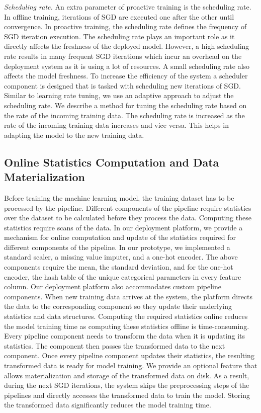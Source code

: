 \textit{Scheduling rate.}
An extra parameter of proactive training is the scheduling rate.
In offline training, iterations of SGD are executed one after the other until convergence.
In proactive training, the scheduling rate defines the frequency of SGD iteration execution.
The scheduling rate plays an important role as it directly affects the freshness of the deployed model.
However, a high scheduling rate results in many frequent SGD iterations which incur an overhead on the deployment system as it is using a lot of resources.
A small scheduling rate also affects the model freshness.
To increase the efficiency of the system a scheduler component is designed that is tasked with scheduling new iterations of SGD.
Similar to learning rate tuning, we use an adaptive approach to adjust the scheduling rate.
We describe a method for tuning the scheduling rate based on the rate of the incoming training data.
The scheduling rate is increased as the rate of the incoming training data increases and vice versa.
This helps in adapting the model to the new training data.

\subsection{Online Statistics Computation and Data Materialization}
Before training the machine learning model, the training dataset has to be processed by the pipeline.
Different components of the pipeline require statistics over the dataset to be calculated before they process the data.
Computing these statistics require scans of the data.
In our deployment platform, we provide a mechanism for online computation and update of the statistics required for different components of the pipeline.
In our prototype, we implemented a standard scaler, a missing value imputer, and a one-hot encoder.
The above components require the mean, the standard deviation, and for the one-hot encoder, the hash table of the unique categorical parameters in every feature column.
Our deployment platform also accommodates custom pipeline components.
When new training data arrives at the system, the platform directs the data to the corresponding component so they update their underlying statistics and data structures.
Computing the required statistics online reduces the model training time as computing these statistics offline is time-consuming.
Every pipeline component needs to transform the data when it is updating its statistics.
The component then passes the transformed data to the next component.
Once every pipeline component updates their statistics, the resulting transformed data is ready for model training.
We provide an optional feature that allows materialization and storage of the transformed data on disk.
As a result, during the next SGD iterations, the system skips the preprocessing steps of the pipelines and directly accesses the transformed data to train the model.
Storing the transformed data significantly reduces the model training time.

